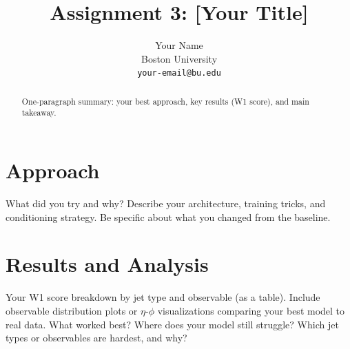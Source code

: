 \documentclass{article}
\title{Assignment 3: [Your Title]}
\author{%
  Your Name \\
  Boston University \\
  \texttt{your-email@bu.edu}
}
\begin{document}
\maketitle

\begin{abstract}
One-paragraph summary: your best approach, key results (W1 score), and main takeaway.
\end{abstract}

\section{Approach}

What did you try and why? Describe your architecture, training tricks, and conditioning strategy. Be specific about what you changed from the baseline.


\section{Results and Analysis}

Your W1 score breakdown by jet type and observable (as a table). Include observable distribution plots or $\eta$-$\phi$ visualizations comparing your best model to real data. What worked best? Where does your model still struggle? Which jet types or observables are hardest, and why?
\end{document}
